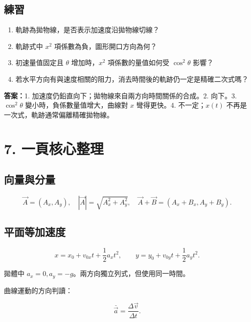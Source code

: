 \documentclass[11pt,a4paper]{article}
\providecommand{\tightlist}{%
  \setlength{\itemsep}{0pt}\setlength{\parskip}{0pt}}
\begin{document}
\begin{HandoutSelfCheck}

\subsection{練習}\label{ux7df4ux7fd2-5}

\begin{enumerate}
\def\labelenumi{\arabic{enumi}.}
\tightlist
\item
  軌跡為拋物線，是否表示加速度沿拋物線切線？
\item
  軌跡式中 \(x^2\) 項係數為負，圖形開口方向為何？
\item
  初速量值固定且 \(\theta\) 增加時，\(x^2\) 項係數的量值如何受 \(\cos^2\theta\) 影響？
\item
  若水平方向有與速度相關的阻力，消去時間後的軌跡仍一定是精確二次式嗎？
\end{enumerate}

\textbf{答案：}1. 加速度仍鉛直向下；拋物線來自兩方向時間關係的合成。2. 向下。3. \(\cos^2\theta\) 變小時，負係數量值增大，曲線對 \(x\) 彎得更快。4. 不一定；\(x(t)\) 不再是一次式，軌跡通常偏離精確拋物線。

\end{HandoutSelfCheck}

\section{7. 一頁核心整理}\label{ux4e00ux9801ux6838ux5fc3ux6574ux7406}

\subsection{向量與分量}\label{ux5411ux91cfux8207ux5206ux91cf}

\[
\vec A=(A_x,A_y),
\quad
|\vec A|=\sqrt{A_x^2+A_y^2},
\quad
\vec A+\vec B=(A_x+B_x,A_y+B_y).
\]

\subsection{平面等加速度}\label{ux5e73ux9762ux7b49ux52a0ux901fux5ea6}

\[
x=x_0+v_{0x}t+\frac12a_xt^2,
\qquad
y=y_0+v_{0y}t+\frac12a_yt^2.
\]

拋體中 \(a_x=0,a_y=-g\)。兩方向獨立列式，但使用同一時間。

曲線運動的方向判讀：

\[
\bar{\vec a}=\frac{\Delta\vec v}{\Delta t}.
\]
\end{document}
